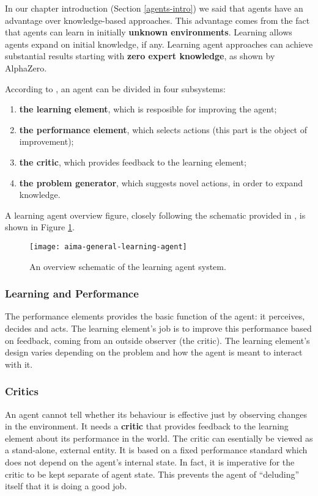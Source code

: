 In our chapter introduction (Section \ref{agents-intro}) we said that agents have an advantage over knowledge-based approaches.
This advantage comes from the fact that agents can learn in initially \textbf{unknown environments}.
Learning allows agents expand on initial knowledge, if any.
Learning agent approaches can achieve substantial results starting with \textbf{zero expert knowledge}, as shown by AlphaZero\cite{alpha-zero}.

According to \cite{aima}, an agent can be divided in four subsystems:
\begin{enumerate}
    \item \textbf{the learning element}, which is resposible for improving the agent;
    \item \textbf{the performance element}, which selects actions (this part is the object of improvement);
    \item \textbf{the critic}, which provides feedback to the learning element;
    \item \textbf{the problem generator}, which suggests novel actions, in order to expand knowledge.    
\end{enumerate}

A learning agent overview figure, closely following the schematic provided in \cite{aima}, is shown in Figure \ref{fig:aima-learning-agent}.

\begin{figure}[ht]
    \texttt{[image: aima-general-learning-agent]}
    \centering
    \caption{An overview schematic of the learning agent system.}
    \label{fig:aima-learning-agent}
\end{figure}

\subsubsection{Learning and Performance}
The performance elements provides the basic function of the agent: it perceives, decides and acts.
The learning element's job is to improve this performance based on feedback, coming from an outside observer (the critic).
The learning element's design varies depending on the problem and how the agent is meant to interact with it.

\subsubsection{Critics}
An agent cannot tell whether its behaviour is effective just by observing changes in the environment.
It needs a \textbf{critic} that provides feedback to the learning element about its performance in the world.
The critic can esentially be viewed as a stand-alone, external entity.
It is based on a fixed performance standard which does not depend on the agent's internal state.
In fact, it is imperative for the critic to be kept separate of agent state.
This prevents the agent of ``deluding'' itself that it is doing a good job.

